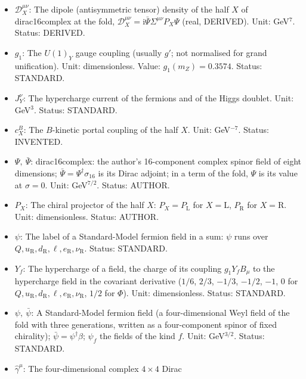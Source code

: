 \documentclass[
  10pt,
]{article}
\begin{document}
\begin{itemize}
  \(d_X\): The dipole-portal coupling of the half \(X\) of
  dirac16complex with the hypercharge field strength. Unit:
  GeV\(^{-5}\). Status: INVENTED.
\item
  \(\mathcal{D}_X^{\mu\nu}\): The dipole (antisymmetric tensor) density
  of the half \(X\) of dirac16complex at the fold,
  \(\mathcal{D}_X^{\mu\nu} = \mathrm{i}\bar\Psi\Sigma^{\mu\nu}P_X\Psi\)
  (real, DERIVED). Unit: GeV\(^7\). Status: DERIVED.
\item
  \(g_1\): The \(U(1)_Y\) gauge coupling (usually \(g'\); not normalised
  for grand unification). Unit: dimensionless. Value:
  \(g_1(m_Z) = 0.3574\). Status: STANDARD.
\item
  \(J_Y^\nu\): The hypercharge current of the fermions and of the Higgs
  doublet. Unit: GeV\(^3\). Status: STANDARD.
\item
  \(c^{B}_X\): The \(B\)-kinetic portal coupling of the half \(X\).
  Unit: GeV\(^{-7}\). Status: INVENTED.
\item
  \(\Psi,\ \bar\Psi\): dirac16complex: the author's 16-component complex
  spinor field of eight dimensions;
  \(\bar\Psi = \Psi^\dagger\sigma_{16}\) is its Dirac adjoint; in a term
  of the fold, \(\Psi\) is its value at \(\sigma = 0\). Unit:
  GeV\(^{7/2}\). Status: AUTHOR.
\item
  \(P_X\): The chiral projector of the half \(X\):
  \(P_X = P_{\mathrm{L}}\) for \(X = \mathrm{L}\), \(P_{\mathrm{R}}\)
  for \(X = \mathrm{R}\). Unit: dimensionless. Status: AUTHOR.
\item
  \(\psi\): The label of a Standard-Model fermion field in a sum:
  \(\psi\) runs over
  \(Q, u_{\mathrm{R}}, d_{\mathrm{R}}, \ell, e_{\mathrm{R}}, \nu_{\mathrm{R}}\).
  Status: STANDARD.
\item
  \(Y_f\): The hypercharge of a field, the charge of its coupling
  \(g_1Y_fB_\mu\) to the hypercharge field in the covariant derivative
  (\(1/6\), \(2/3\), \(-1/3\), \(-1/2\), \(-1\), \(0\) for
  \(Q, u_{\mathrm{R}}, d_{\mathrm{R}}, \ell, e_{\mathrm{R}}, \nu_{\mathrm{R}}\),
  \(1/2\) for \(\Phi\)). Unit: dimensionless. Status: STANDARD.
\item
  \(\psi,\ \bar\psi\): A Standard-Model fermion field (a
  four-dimensional Weyl field of the fold with three generations,
  written as a four-component spinor of fixed chirality);
  \(\bar\psi = \psi^\dagger\beta\); \(\psi_f\) the fields of the kind
  \(f\). Unit: GeV\(^{3/2}\). Status: STANDARD.
\item
  \(\hat\gamma^\mu\): The four-dimensional complex \(4 \times 4\) Dirac

\end{itemize}
\end{document}

